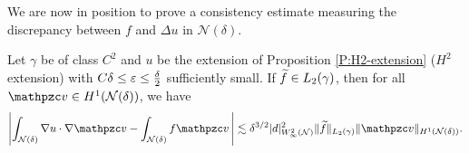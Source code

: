 We are now in position to prove a consistency estimate measuring the discrepancy between $f$ and $\Delta u$ in $\mathcal{N}(\delta)$.
%
\begin{lemma}\label{t:narrow:geom_consistency}
Let $\gamma$ be of class $C^2$ and $u$ be the extension of Proposition \ref{P:H2-extension} ($H^2$ extension) with $C\delta \le \varepsilon \le \frac{\delta}{2}$
sufficiently small. If $\widetilde{f} \in L_2(\gamma)$,
then for all $\tv \in H^1(\mathcal N(\delta))$, we have
%
\begin{equation}\label{e:narrow:geom_consistency}
\left| \int_{\mathcal N(\delta)} \nabla u \cdot \nabla \tv - \int_{\mathcal N(\delta)} f \tv \, \right| \lesssim  \delta^{3/2} |d|_{W^2_\infty(\mathcal{N})}^2 \| \wf \|_{L_2(\gamma)} \|  \tv \|_{H^1(\mathcal N(\delta))}. 	
\end{equation}
\end{lemma}
